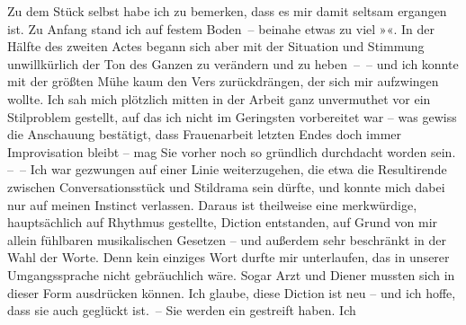 \pstart
           Zu dem Stück selbst habe ich
               zu bemerken, dass es mir damit seltsam ergangen ist. Zu Anfang stand ich auf festem
               Boden – beinahe etwas zu viel »\label{K_L03730-3v}\label{K_L03730-3}«. In
               der Hälfte des zweiten Actes begann sich aber mit der Situation und Stimmung
               unwillkürlich der Ton des Ganzen zu verändern und zu heben – – und ich konnte mit der
               größten Mühe kaum den Vers zurückdrängen, der sich mir aufzwingen wollte. Ich sah
               mich plötzlich mitten in der Arbeit ganz unvermuthet vor ein Stilproblem gestellt,
               auf das ich nicht im Geringsten vorbereitet war – was gewiss die Anschauung
               bestätigt, dass {\pb}Frauenarbeit letzten Endes doch immer
               Improvisation bleibt – mag Sie vorher noch so gründlich durchdacht worden sein. – –
               Ich war gezwungen auf einer Linie weiterzugehen, die etwa die Resultirende zwischen
               Conversationsstück und Stildrama sein dürfte, und konnte mich dabei nur auf meinen
               Instinct verlassen. Daraus ist theilweise eine merkwürdige, hauptsächlich auf
               Rhythmus gestellte, Diction entstanden, auf Grund von mir allein fühlbaren \introOben{}musikalischen\introOben{} Gesetzen – und außerdem sehr beschränkt in der
               Wahl der Worte. Denn kein einziges Wort durfte mir unterlaufen, das in unserer
               Umgangssprache nicht gebräuchlich wäre. Sogar Arzt und Diener mussten sich in dieser
               Form ausdrücken können. Ich glaube, diese Diction ist neu – und ich hoffe, dass sie
               auch geglückt ist. – Sie werden ein \label{K_L03730-4v}\label{K_L03730-4} gestreift haben. Ich
